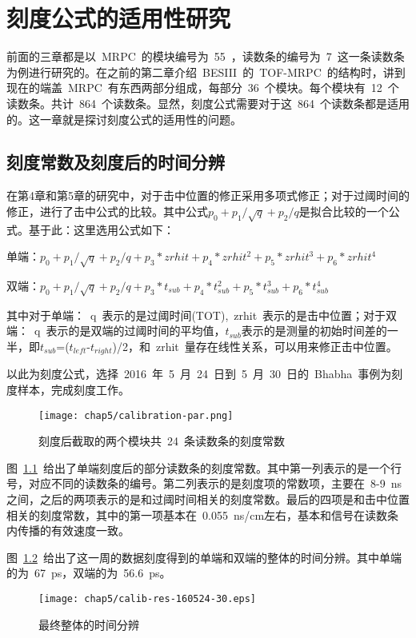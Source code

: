 \chapter{刻度公式的适用性研究}
前面的三章都是以~MRPC~的模块编号为~55~，读数条的编号为~7~这一条读数条为例进行研究的。在之前的第二章介绍~BESIII~的~TOF-MRPC~的结构时，讲到现在的端盖~MRPC~有东西两部分组成，每部分~36~个模块。每个模块有~12~个读数条。共计~864~个读数条。显然，刻度公式需要对于这~864~个读数条都是适用的。这一章就是探讨刻度公式的适用性的问题。
\section{刻度常数及刻度后的时间分辨}
在第4章和第5章的研究中，对于击中位置的修正采用多项式修正；对于过阈时间的修正，进行了击中公式的比较。其中公式${p_{0}+p_{1}/\sqrt{q}+p_{2}/q}$是拟合比较的一个公式。基于此：这里选用公式如下：

单端：$p_{0}+p_{1}/\sqrt{q}+p_{2}/q+p_{3}*zrhit+p_{4}*zrhit^{2}+p_{5}*zrhit^{3}+p_{6}*zrhit^{4}$

双端：$p_{0}+p_{1}/\sqrt{q}+p_{2}/q+p_{3}*t_{sub}+p_{4}*t_{sub}^{2}+p_{5}*t_{sub}^{3}+p_{6}*t_{sub}^{4}$

其中对于单端：~q~表示的是过阈时间(TOT),~zrhit~表示的是击中位置；对于双端：~q~表示的是双端的过阈时间的平均值，$t_{sub}$表示的是测量的初始时间差的一半，即$t_{sub}$=($t_{left}$-$t_{right}$)/2，和~zrhit~量存在线性关系，可以用来修正击中位置。


以此为刻度公式，选择~2016~年~5~月~24~日到~5~月~30~日的~Bhabha~事例为刻度样本，完成刻度工作。

\begin{figure}[!h]
\centering
\texttt{[image: chap5/calibration-par.png]}
\caption{刻度后截取的两个模块共~24~条读数条的刻度常数}
\label{fig:calibration-par}
\end{figure}
图~\ref{fig:calibration-par}~给出了单端刻度后的部分读数条的刻度常数。其中第一列表示的是一个行号，对应不同的读数条的编号。第二列表示的是刻度项的常数项，主要在~8-9~ns之间，之后的两项表示的是和过阈时间相关的刻度常数。最后的四项是和击中位置相关的刻度常数，其中的第一项基本在~0.055~ns/cm左右，基本和信号在读数条内传播的有效速度一致。

图~\ref{fig:calib-res-160524-30}~给出了这一周的数据刻度得到的单端和双端的整体的时间分辨。其中单端的为~67~ps，双端的为~56.6~ps。
\begin{figure}[!h]
\centering
\texttt{[image: chap5/calib-res-160524-30.eps]}
\caption{最终整体的时间分辨}
\label{fig:calib-res-160524-30}
\end{figure}


